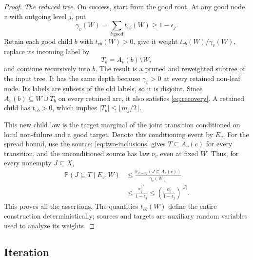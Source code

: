 \documentclass[11pt]{article}
\numberwithin{equation}{section}
\newcommand{\PP}{\mathbb P}
\begin{document}
\begin{proof}
\medskip\noindent
\textit{The reduced tree.}
On success, start from the good root. At any good node $v$ with
outgoing level $j$, put
\[
 \gamma_v(W)=\sum_{b\ \mathrm{good}}t_{vb}(W)\ge1-\epsilon_j.
\]
Retain each good child $b$ with $t_{vb}(W)>0$, give it weight
$t_{vb}(W)/\gamma_v(W)$, replace its incoming label by
\[
 T_b=A_v(b)\setminus W,
\]
and continue recursively into $b$. The result is a pruned and
reweighted subtree of the input tree. It has the same depth because
$\gamma_v>0$ at every retained non-leaf node. Its labels are subsets
of the old labels, so it is disjoint. Since
$A_v(b)\subseteq W\cup T_b$ on every retained arc, it also satisfies
\eqref{eq:recovery}. A retained child has $t_{vb}>0$, which implies
$|T_b|\le\lfloor m_j/2\rfloor$.

This new child law is the target marginal of the joint transition
conditioned on local non-failure and a good target. Denote this
conditioning event by $E_v$. For the spread bound, use the source:
\eqref{eq:two-inclusions} gives $T\subseteq A_v(c)$ for every
transition, and the unconditioned source has law $\nu_v$ even at fixed
$W$. Thus, for every nonempty $J\subseteq X$,
\begin{align*}
 \PP(J\subseteq T\mid E_v,W)
 &\le\frac{\PP_{c\sim\nu_v}(J\subseteq A_v(c))}{\gamma_v(W)}\\
 &\le\frac{\alpha_j^{|J|}}{1-\epsilon_j}
 \le\left(\frac{\alpha_j}{1-\epsilon_j}\right)^{|J|}.
\end{align*}
This proves all the assertions. The quantities $t_{vb}(W)$ define
the entire construction deterministically; sources and targets are
auxiliary random variables used to analyze its weights.
\end{proof}

\subsection{Iteration}
\end{document}
